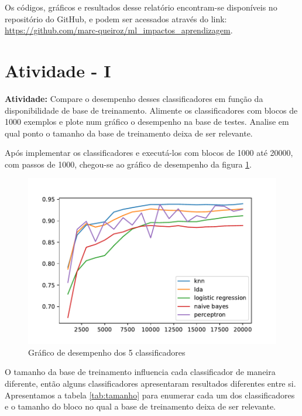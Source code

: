 \documentclass[12pt,
	english,			%
	french,				%
	spanish,			%
	brazil,				%
	]{article}
\begin{document}
Os códigos, gráficos e resultados desse relatório encontram-se disponíveis no repositório do GitHub, e podem ser acessados através do link: \url{https://github.com/marc-queiroz/ml_impactos_aprendizagem}.

\section{Atividade - I}

\textbf{Atividade:} Compare o desempenho desses classificadores em função da disponibilidade de base de treinamento. Alimente os classificadores com blocos de 1000 exemplos e plote num gráfico o desempenho na base de testes. Analise em qual ponto o tamanho da base de treinamento deixa de ser relevante.

Após implementar os classificadores e executá-los com blocos de 1000 até 20000, com passos de 1000, chegou-se ao gráfico de desempenho da figura \ref{fig:grafico01}.

\begin{figure}[H]
\centering
\includegraphics[width=1\textwidth]{grafico01.pdf}
\caption{\label{fig:grafico01}Gráfico de desempenho dos 5 classificadores}
\end{figure}

O tamanho da base de treinamento influencia cada classificador de maneira diferente, então alguns classificadores apresentaram resultados diferentes entre si. Apresentamos a tabela \ref{tab:tamanho} para enumerar cada um dos classificadores e o tamanho do bloco no qual a base de treinamento deixa de ser relevante.
\end{document}
